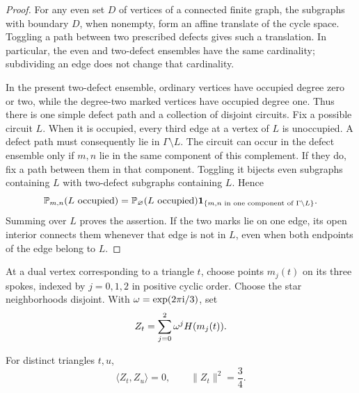 \begin{proof}
For any even set $D$ of vertices of a connected finite graph, the subgraphs
with boundary $D$, when nonempty, form an affine translate of the cycle
space.  Toggling a path between two prescribed defects gives such a
translation.  In particular, the even and two-defect ensembles have the same
cardinality; subdividing an edge does not change that cardinality.

In the present two-defect ensemble, ordinary vertices have occupied degree
zero or two, while the degree-two marked vertices have occupied degree one.
Thus there is one simple defect path and a collection of disjoint circuits.
Fix a possible circuit $L$.  When it is occupied, every third edge at a
vertex of $L$ is unoccupied.  A defect path must consequently lie in
$\Gamma\setminus L$.  The circuit can occur in the defect ensemble only if
$m,n$ lie in the same component of this complement.  If they do, fix a path
between them in that component.  Toggling it bijects even subgraphs
containing $L$ with two-defect subgraphs containing $L$.  Hence
\[
 \mathbb P_{m,n}(L\text{ occupied})
 =\mathbb P_{\varnothing}(L\text{ occupied})
   \mathbf 1_{\{m,n\text{ in one component of }\Gamma\setminus L\}}.
\]
Summing over $L$ proves the assertion.  If the two marks lie on one edge,
its open interior connects them whenever that edge is not in $L$, even when
both endpoints of the edge belong to $L$.
\end{proof}

At a dual vertex corresponding to a triangle $t$, choose points
$m_j(t)$ on its three spokes, indexed by $j=0,1,2$ in positive cyclic order.
Choose the star neighborhoods disjoint.  With
$\omega=\exp(2\pi\mathrm i/3)$, set
\[
 Z_t=\sum_{j=0}^2\omega^jH(m_j(t)).
\]

\begin{proposition}\label{fields:orthogonality-prop}
For distinct triangles $t,u$,
\begin{equation}\label{fields:orthogonal}
 \langle Z_t,Z_u\rangle=0,
 \qquad \|Z_t\|^2=\frac34.
\end{equation}
\end{proposition}

